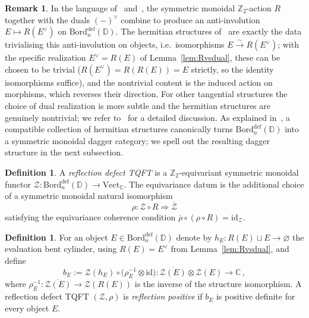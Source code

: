 \documentclass[11pt]{article}
\theoremstyle{definition}
\newtheorem{definition}[theorem]{Definition}
\newtheorem{remark}[theorem]{Remark}
\newcommand{\cZ}{\mathcal{Z}}
\newcommand{\bC}{\mathbb{C}}
\newcommand{\bZ}{\mathbb{Z}}
\newcommand{\bD}{\mathbb{D}}
\newcommand{\Bord}{\mathrm{Bord}}
\newcommand{\Vect}{\mathrm{Vect}}
\begin{document}
\begin{remark}
\label{rem:hermitianstructures}
In the language of~\cite[Appendix B]{FH16} and~\cite{SS23,Ste23}, the symmetric monoidal $\bZ_2$-action $R$ together with the duals $(-)^\vee$ combine to produce an anti-involution $E \longmapsto R(E^\vee)$ on $\Bord_n^{\textrm{def}}(\bD)$. The hermitian structures of~\cite{SS23,Ste23} are exactly the data trivialising this anti-involution on objects, i.e.\ isomorphisms $E \xrightarrow{\sim} R(E^\vee)$; with the specific realization $E^\vee = R(E)$ of Lemma~\ref{lem:Rvsdual}, these can be chosen to be trivial ($R(E^\vee) = R(R(E)) = E$ strictly, so the identity isomorphisms suffice), and the nontrivial content is the induced action on morphisms, which reverses their direction. For other tangential structures the choice of dual realization is more subtle and the hermitian structures are genuinely nontrivial; we refer to~\cite{Ste23} for a detailed discussion. As explained in~\cite{SS23,Ste23}, a compatible collection of hermitian structures canonically turns $\Bord_n^{\textrm{def}}(\bD)$ into a symmetric monoidal dagger category; we spell out the resulting dagger structure in the next subsection.
\end{remark}


\begin{definition}
\label{def:hermitiandefectTQFT}
A \emph{reflection defect TQFT} is a $\bZ_2$-equivariant symmetric monoidal functor $\cZ \colon \Bord_n^{\textrm{def}}(\bD) \to \Vect_\bC$. The equivariance datum is the additional choice of a symmetric monoidal natural isomorphism
\begin{equation}
  \rho \colon \cZ \circ R \Longrightarrow \overline{\cZ}
\end{equation}
satisfying the equivariance coherence condition $\overline{\rho} \circ (\rho \circ R) = \mathrm{id}_{\cZ}$.
\end{definition}

\begin{definition}
\label{def:RPproperty}
For an object $E \in \Bord_n^{\textrm{def}}(\bD)$ denote by $h_E \colon R(E) \sqcup E \to \varnothing$ the evaluation bent cylinder, using $R(E) = E^\vee$ from Lemma~\ref{lem:Rvsdual}, and define
\begin{equation}
  b_E := \cZ(h_E) \circ \big(\rho_E^{-1} \otimes \mathrm{id}\big) \colon \overline{\cZ(E)} \otimes \cZ(E) \longrightarrow \bC \, ,
\end{equation}
where $\rho_E^{-1} \colon \overline{\cZ(E)} \to \cZ(R(E))$ is the inverse of the structure isomorphism. A reflection defect TQFT $(\cZ, \rho)$ is \emph{reflection positive} if $b_E$ is positive definite for every object $E$.
\end{definition}
\end{document}
